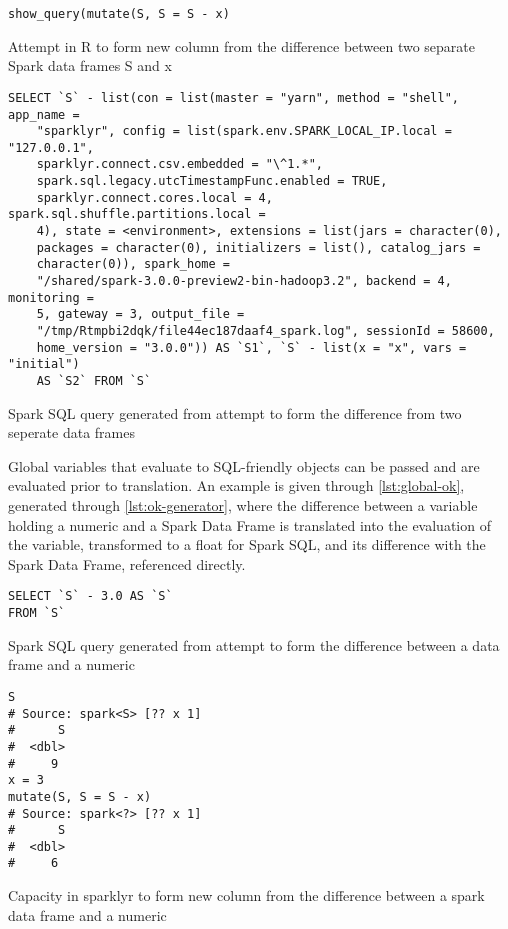 \begin{listing}
	\begin{verbatim}
show_query(mutate(S, S = S - x)
\end{verbatim}
	\caption{Attempt in R to form new column from the difference between two separate Spark data frames S and x}
	\label{lst:bad}
\end{listing}

\begin{listing}
	\begin{verbatim}
SELECT `S` - list(con = list(master = "yarn", method = "shell", app_name =
	"sparklyr", config = list(spark.env.SPARK_LOCAL_IP.local = "127.0.0.1",
	sparklyr.connect.csv.embedded = "\^1.*",
	spark.sql.legacy.utcTimestampFunc.enabled = TRUE,
	sparklyr.connect.cores.local = 4, spark.sql.shuffle.partitions.local =
	4), state = <environment>, extensions = list(jars = character(0),
	packages = character(0), initializers = list(), catalog_jars =
	character(0)), spark_home =
	"/shared/spark-3.0.0-preview2-bin-hadoop3.2", backend = 4, monitoring =
	5, gateway = 3, output_file =
	"/tmp/Rtmpbi2dqk/file44ec187daaf4_spark.log", sessionId = 58600,
	home_version = "3.0.0")) AS `S1`, `S` - list(x = "x", vars = "initial")
	AS `S2` FROM `S`
\end{verbatim}
	\caption{Spark SQL query generated from attempt to form the difference from two seperate data frames}
	\label{lst:computer-no}
\end{listing}

Global variables that evaluate to SQL-friendly objects can be passed and
are evaluated prior to translation. An example is given through
\ref{lst:global-ok}, generated through \ref{lst:ok-generator}, where
the difference between a variable holding a numeric and a Spark Data
Frame is translated into the evaluation of the variable, transformed to
a float for Spark SQL, and its difference with the Spark Data Frame,
referenced directly.

\begin{listing}
	\begin{verbatim}
SELECT `S` - 3.0 AS `S`
FROM `S`
\end{verbatim}
	\caption{Spark SQL query generated from attempt to form the difference between a data frame and a numeric}
	\label{lst:global-ok}
\end{listing}

\begin{listing}
	\begin{verbatim}
S
# Source: spark<S> [?? x 1]
#      S
#  <dbl>
#     9
x = 3
mutate(S, S = S - x)
# Source: spark<?> [?? x 1]
#      S
#  <dbl>
#     6
\end{verbatim}
	\caption{Capacity in sparklyr to form new column from the difference between a spark data frame and a numeric}
	\label{lst:ok-generator}
\end{listing}

